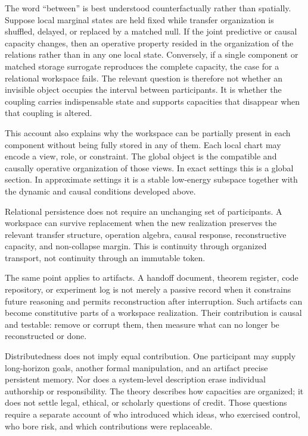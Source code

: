 The word ``between'' is best understood counterfactually rather than spatially. Suppose local marginal
states are held fixed while transfer organization is shuffled, delayed, or replaced by a matched null. If
the joint predictive or causal capacity changes, then an operative property resided in the organization of
the relations rather than in any one local state. Conversely, if a single component or matched storage
surrogate reproduces the complete capacity, the case for a relational workspace fails. The relevant
question is therefore not whether an invisible object occupies the interval between participants. It is
whether the coupling carries indispensable state and supports capacities that disappear when that
coupling is altered.

This account also explains why the workspace can be partially present in each component without being
fully stored in any of them. Each local chart may encode a view, role, or constraint. The global object is
the compatible and causally operative organization of those views. In exact settings this is a global
section. In approximate settings it is a stable low-energy subspace together with the dynamic and causal
conditions developed above.


Relational persistence does not require an unchanging set of participants. A workspace can survive
replacement when the new realization preserves the relevant transfer structure, operation algebra,
causal response, reconstructive capacity, and non-collapse margin. This is continuity through organized
transport, not continuity through an immutable token.

The same point applies to artifacts. A handoff document, theorem register, code repository, or experiment
log is not merely a passive record when it constrains future reasoning and permits reconstruction after
interruption. Such artifacts can become constitutive parts of a workspace realization. Their contribution
is causal and testable: remove or corrupt them, then measure what can no longer be reconstructed or done.

Distributedness does not imply equal contribution. One participant may supply long-horizon goals, another
formal manipulation, and an artifact precise persistent memory. Nor does a system-level description erase
individual authorship or responsibility. The theory describes how capacities are organized; it does not
settle legal, ethical, or scholarly questions of credit. Those questions require a separate account of who
introduced which ideas, who exercised control, who bore risk, and which contributions were replaceable.

